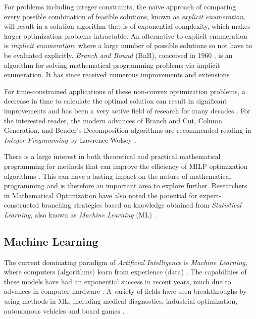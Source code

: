 For problems including integer constraints, the na\"ive approach of comparing every possible combination of feasible solutions, known as \textit{explicit enumeration}, will result in a solution algorithm that is of exponential complexity, which makes larger optimization problems intractable. An alternative to explicit enumeration is \textit{implicit enumeration}, where a large number of possible solutions so not have to be evaluated explicitly. 
\textit{Branch and Bound} (\gls{BnB}), conceived in 1960 \cite{land1960automatic}, is an algorithm for solving mathematical programming problems via implicit enumeration. It has since received numerous improvements and extensions \cite{wolsey2020integer}. 

For time-constrained applications of these non-convex optimization problems, a decrease in time to calculate the optimal solution can result in significant improvements and has been a very active field of research for many decades \cite{wolsey2020integer}. For the interested reader, the modern advances of Branch and Cut, Column Generation, and Bender's Decomposition algorithms are recommended reading in \textit{Integer Programming} by Lawrence Wolsey \cite{wolsey2020integer}.


There is a large interest in both theoretical and practical mathematical programming for methods that can improve the efficiency of \gls{MILP} optimization algorithms \cite{wolsey2020integer}. This can have a lasting impact on the nature of mathematical programming and is therefore an important area to explore further. Researchers in Mathematical Optimization have also noted the potential for expert-constructed branching strategies based on knowledge obtained from \textit{Statistical Learning}, also known as \textit{Machine Learning} (\Gls{ML}) \cite{lodi2017learning}.


\subsection{Machine Learning}

The current dominating paradigm of \textit{Artificial Intelligence} is \textit{Machine Learning}, where computers (algorithms) learn from experience (data) \cite{goodfellow2016deep}. The capabilities of these models have had an exponential success in recent years, much due to advances in computer hardware \cite{goodfellow2016deep}. A variety of fields have seen breakthroughs by using methods in \gls{ML}, including medical diagnostics, industrial optimization, autonomous vehicles and board games \cite{goodfellow2016deep}. 

